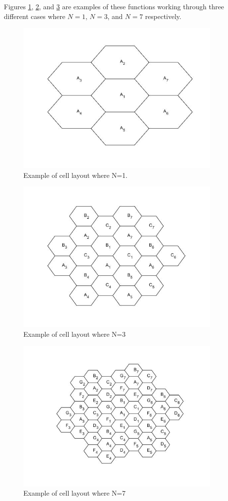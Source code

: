 \documentclass{article}
\begin{document}
Figures \ref{N1}, \ref{N3}, and \ref{N7} are examples of these functions working through three different cases where \(N=1\), \(N=3\), and \(N=7\) respectively. 

\begin{figure}[h]
\centerline{\includegraphics[width=4in]{latex/images/N1.jpg}}
\caption{Example of cell layout where N=1.}
\label{N1}
\end{figure}

\begin{figure}[h]
\centerline{\includegraphics[width=4in]{latex/images/N3.jpg}}
\caption{Example of cell layout where N=3}
\label{N3}
\end{figure}

\begin{figure}[h]
\centerline{\includegraphics[width=4in]{latex/images/N7.jpg}}
\caption{Example of cell layout where N=7}
\label{N7}
\end{figure}
\end{document}

